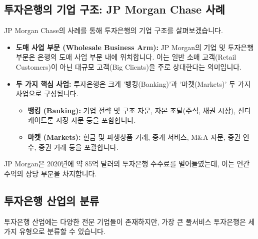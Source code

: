 \documentclass[11pt,a4paper]{article}
\theoremstyle{definition}
\begin{document}
\subsection{투자은행의 기업 구조: JP Morgan Chase 사례}
JP Morgan Chase의 사례를 통해 투자은행의 기업 구조를 살펴보겠습니다.
\begin{itemize}
    \item \textbf{도매 사업 부문 (Wholesale Business Arm):} JP Morgan의 기업 및 투자은행 부문은 은행의 도매 사업 부문 내에 위치합니다. 이는 일반 소매 고객(Retail Customers)이 아닌 대규모 고객(Big Clients)을 주로 상대한다는 의미입니다.
    \item \textbf{두 가지 핵심 사업:} 투자은행은 크게 '뱅킹(Banking)'과 '마켓(Markets)' 두 가지 사업으로 구성됩니다.
    \begin{itemize}
        \item \textbf{뱅킹 (Banking):} 기업 전략 및 구조 자문, 자본 조달(주식, 채권 시장), 신디케이트론 시장 자문 등을 포함합니다.
        \item \textbf{마켓 (Markets):} 현금 및 파생상품 거래, 중개 서비스, M\&A 자문, 증권 인수, 증권 거래 등을 포괄합니다.
    \end{itemize}
\end{itemize}
JP Morgan은 2020년에 약 85억 달러의 투자은행 수수료를 벌어들였는데, 이는 연간 수익의 상당 부분을 차지합니다.

\subsection{투자은행 산업의 분류}
투자은행 산업에는 다양한 전문 기업들이 존재하지만, 가장 큰 풀서비스 투자은행은 세 가지 유형으로 분류할 수 있습니다.
\end{document}
